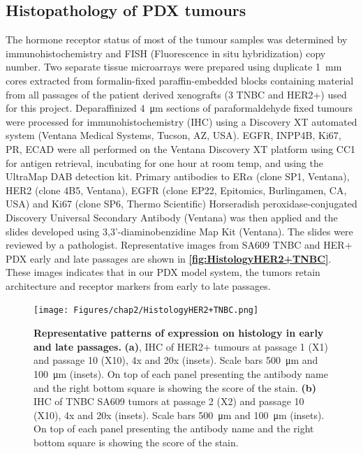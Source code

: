 \subsection{Histopathology of PDX tumours} 
The hormone receptor status of most of the tumour samples was determined by immunohistochemistry and FISH (Fluorescence in situ hybridization) copy number.
Two separate tissue microarrays were prepared using duplicate \SI{1}{\mm} cores extracted from formalin-fixed paraffin-embedded blocks containing material from all passages of the patient derived xenografts (3 TNBC and HER2+) used for this project. 
Deparaffinized \SI{4}{\um} sections of paraformaldehyde fixed tumours were processed for immunohistochemistry (IHC) using a Discovery XT automated system (Ventana Medical Systems, Tucson, AZ, USA). 
EGFR, INPP4B, Ki67, PR, ECAD were all performed on the Ventana Discovery XT platform using CC1 for antigen retrieval, incubating for one hour at room temp, and using the UltraMap DAB detection kit.
Primary antibodies to ER$\alpha$ (clone SP1, Ventana), HER2 (clone 4B5, Ventana), EGFR (clone EP22, Epitomics, Burlingamen, CA, USA) and Ki67 (clone SP6, Thermo Scientific) 
Horseradish peroxidase-conjugated Discovery Universal Secondary Antibody (Ventana) was then applied and the slides developed using 3,3’-diaminobenzidine Map Kit (Ventana). 
The slides were reviewed by a pathologist. Representative images from SA609 TNBC and HER+ PDX early and late passages are shown in \textbf{\autoref{fig:HistologyHER2+TNBC}}. These images indicates that in our PDX model system, the tumors retain architecture and receptor markers from early to late passages.


 \begin{figure}
\centering
\texttt{[image: Figures/chap2/HistologyHER2+TNBC.png]}
	
\caption[Untreated PDX timeseries and growth trajectories]
	{\small
\textbf{Representative patterns of expression on histology in early and late passages.}
 \textbf{(a)}, IHC of HER2+ tumours at passage 1 (X1) and passage 10 (X10), 4x and 20x (insets). Scale bars \SI{500}{\micro\metre} and \SI{100}{\micro\metre} (insets). On top of each panel presenting the antibody name and the right bottom square is showing the score of the stain.
\textbf{(b)} IHC of TNBC SA609 tumors at passage 2 (X2) and passage 10 (X10), 4x and 20x (insets). Scale bars \SI{500}{\micro\metre} and \SI{100}{\micro\metre} (insets). On top of each panel presenting the antibody name and the right bottom square is showing the score of the stain.}
	\label{fig:HistologyHER2+TNBC}
\end{figure}


